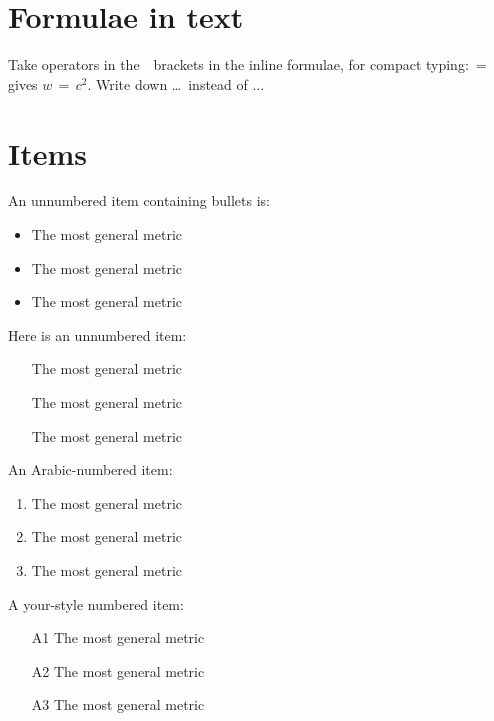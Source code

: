 \documentclass[twoside,final]{article}
\begin{document}
{%


\section{Formulae in text}

Take operators in the \,{}\, brackets in the inline formulae, for compact typing: \,{=}\, gives $w \,{=}\, c^2 $. Write down \dots \ instead of ...


\section{Items}


An unnumbered item containing bullets is:
\begin{itemize}
\item The most general metric
\item The most general metric
\item The most general metric
\end{itemize}


Here is an unnumbered item:
\begin{itemize}
\item [] The most general metric
\item [] The most general metric
\item [] The most general metric
\end{itemize}


An Arabic-numbered item:
\begin{enumerate}
\item The most general metric
\item The most general metric
\item The most general metric
\end{enumerate}


A your-style numbered item:
\begin{itemize}
\item [A1] The most general metric
\item [A2] The most general metric
\item [A3] The most general metric
\end{itemize}


}
\end{document}
